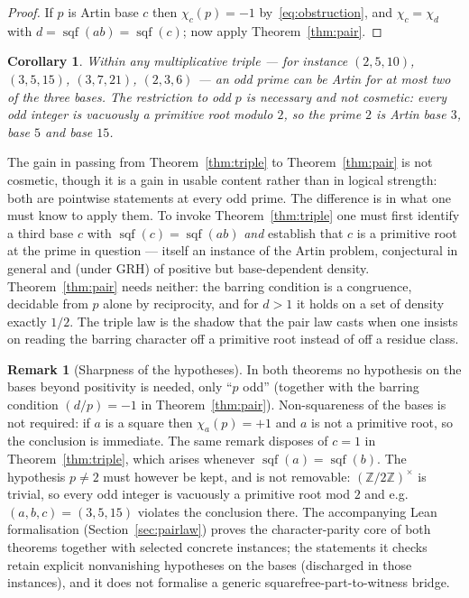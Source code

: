 \documentclass[11pt,reqno]{amsart}
\theoremstyle{plain}
\newtheorem{corollary}[theorem]{Corollary}
\theoremstyle{definition}
\newtheorem{remark}[theorem]{Remark}
\DeclareMathOperator{\sqf}{sqf}
\newcommand{\Z}{\mathbb{Z}}
\begin{document}
\begin{proof}
If $p$ is Artin base $c$ then $\chi_c(p) = -1$ by~\eqref{eq:obstruction}, and
$\chi_c = \chi_d$ with $d = \sqf(ab) = \sqf(c)$; now apply
Theorem~\ref{thm:pair}.
\end{proof}

\begin{corollary}
\label{cor:twoofthree}
Within any multiplicative triple --- for instance $(2, 5, 10)$, $(3, 5, 15)$,
$(3, 7, 21)$, $(2, 3, 6)$ --- an \emph{odd} prime can be Artin for at most two
of the three bases. The restriction to odd $p$ is necessary and not cosmetic:
every odd integer is vacuously a primitive root modulo $2$, so the prime $2$
is Artin base $3$, base $5$ and base $15$.
\end{corollary}

The gain in passing from Theorem~\ref{thm:triple} to Theorem~\ref{thm:pair} is
not cosmetic, though it is a gain in usable content rather than in logical
strength: both are pointwise statements at every odd prime. The difference is
in what one must know to apply them. To invoke
Theorem~\ref{thm:triple} one must first identify a third base $c$ with
$\sqf(c) = \sqf(ab)$ \emph{and} establish that $c$ is a primitive root at the
prime in question --- itself an instance of the Artin problem, conjectural in
general and (under GRH) of positive but base-dependent density.
Theorem~\ref{thm:pair} needs neither: the barring condition is a congruence,
decidable from $p$ alone by reciprocity, and for $d > 1$ it holds on a set of
density exactly $1/2$. The triple law is the shadow that the pair law casts when
one insists on reading the barring character off a primitive root instead of off
a residue class.

\begin{remark}[Sharpness of the hypotheses]
In both theorems no hypothesis on the bases beyond positivity is needed, only ``$p$ odd'' (together with the barring condition $(d/p) = -1$ in Theorem~\ref{thm:pair}). Non-squareness of the bases is not
required: if $a$ is a square then $\chi_a(p) = +1$ and $a$ is not a primitive
root, so the conclusion is immediate. The same remark disposes of $c = 1$ in
Theorem~\ref{thm:triple}, which arises whenever $\sqf(a) = \sqf(b)$. The
hypothesis $p \ne 2$ must however be kept, and is not removable:
$(\Z/2\Z)^\times$ is trivial, so every odd integer is vacuously a primitive
root mod $2$ and e.g.\ $(a,b,c) = (3,5,15)$ violates the conclusion there. The accompanying Lean formalisation (Section~\ref{sec:pairlaw}) proves the
character-parity core of both theorems together with selected concrete
instances; the statements it checks retain explicit nonvanishing hypotheses on
the bases (discharged in those instances), and it does not formalise a generic
squarefree-part-to-witness bridge.
\end{remark}
\end{document}
